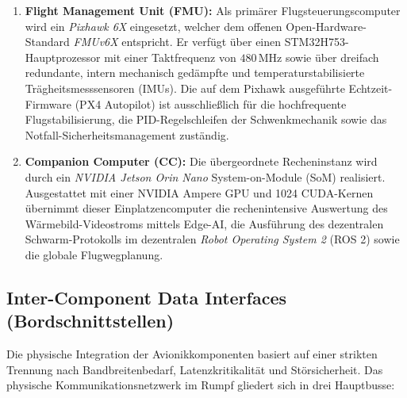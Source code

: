 \begin{enumerate}
    \item \textbf{Flight Management Unit (FMU):} Als primärer Flugsteuerungscomputer wird ein \textit{Pixhawk 6X} eingesetzt, welcher dem offenen Open-Hardware-Standard \textit{FMUv6X} entspricht. 
                                                 Er verfügt über einen STM32H753-Hauptprozessor mit einer Taktfrequenz von $480\,\text{MHz}$ sowie über dreifach redundante, intern mechanisch gedämpfte und 
                                                 temperaturstabilisierte Trägheitsmesssensoren (IMUs). Die auf dem Pixhawk ausgeführte Echtzeit-Firmware (PX4 Autopilot) ist ausschließlich für die hochfrequente Flugstabilisierung, 
                                                 die PID-Regelschleifen der Schwenkmechanik sowie das Notfall-Sicherheitsmanagement zuständig.
    \item \textbf{Companion Computer (CC):} Die übergeordnete Recheninstanz wird durch ein \textit{NVIDIA Jetson Orin Nano} System-on-Module (SoM) realisiert. Ausgestattet mit einer NVIDIA Ampere GPU und 1024 CUDA-Kernen übernimmt dieser 
                                            Einplatzencomputer die rechenintensive Auswertung des Wärmebild-Videostroms mittels Edge-AI, die Ausführung des dezentralen Schwarm-Protokolls im dezentralen \textit{Robot Operating System 2} (ROS 2) 
                                            sowie die globale Flugwegplanung.
\end{enumerate}

\subsection{Inter-Component Data Interfaces (Bordschnittstellen)}
Die physische Integration der Avionikkomponenten basiert auf einer strikten Trennung nach Bandbreitenbedarf, Latenzkritikalität und Störsicherheit. Das physische Kommunikationsnetzwerk im Rumpf gliedert sich in drei Hauptbusse:

